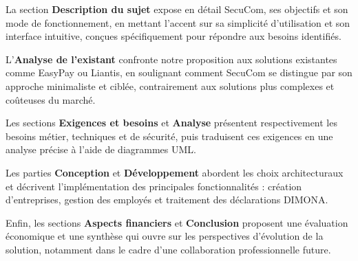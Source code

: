 La section \textbf{Description du sujet} expose en détail SecuCom, ses objectifs et son mode de fonctionnement, en mettant l'accent sur sa simplicité d'utilisation et son interface intuitive, conçues spécifiquement pour répondre aux besoins identifiés.

L'\textbf{Analyse de l'existant} confronte notre proposition aux solutions existantes comme EasyPay ou Liantis, en soulignant comment SecuCom se distingue par son approche minimaliste et ciblée, contrairement aux solutions plus complexes et coûteuses du marché.

Les sections \textbf{Exigences et besoins} et \textbf{Analyse} présentent respectivement les besoins métier, techniques et de sécurité, puis traduisent ces exigences en une analyse précise à l'aide de diagrammes UML.

Les parties \textbf{Conception} et \textbf{Développement} abordent les choix architecturaux et décrivent l'implémentation des principales fonctionnalités : création d'entreprises, gestion des employés et traitement des déclarations DIMONA.

Enfin, les sections \textbf{Aspects financiers} et \textbf{Conclusion} proposent une évaluation économique et une synthèse qui ouvre sur les perspectives d'évolution de la solution, notamment dans le cadre d'une collaboration professionnelle future.
